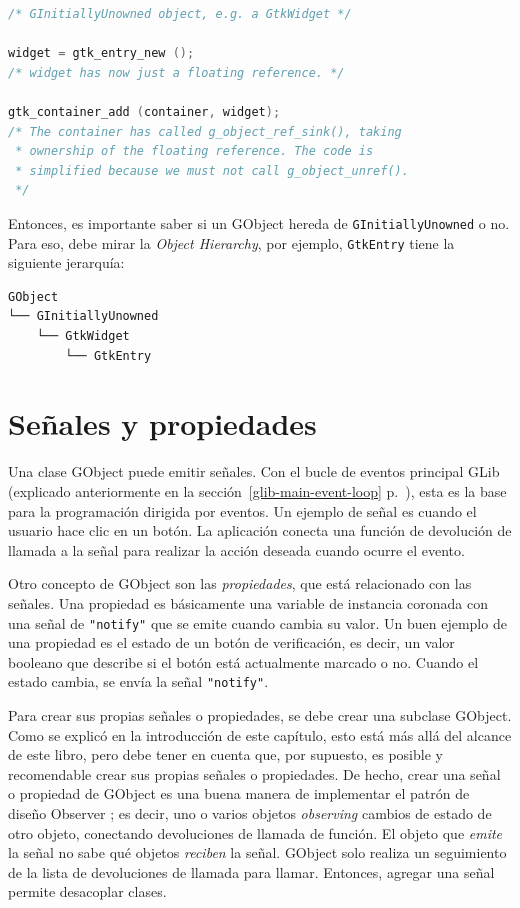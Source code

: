 \begin{lstlisting}[language=C, caption={Gestión de memoria de GObjects derivados de \lstinline{GInitiallyUnowned}.}, label=oop-gobject-mem-management-floating]
/* GInitiallyUnowned object, e.g. a GtkWidget */

widget = gtk_entry_new ();
/* widget has now just a floating reference. */

gtk_container_add (container, widget);
/* The container has called g_object_ref_sink(), taking
 * ownership of the floating reference. The code is
 * simplified because we must not call g_object_unref().
 */
\end{lstlisting}

Entonces, es importante saber si un GObject hereda de \lstinline{GInitiallyUnowned} o no. Para eso, debe mirar la \emph{Object Hierarchy}, por ejemplo, \lstinline{GtkEntry} tiene la siguiente jerarquía:

\begin{verbatim}
GObject
└── GInitiallyUnowned
    └── GtkWidget
        └── GtkEntry
\end{verbatim}

\section{Señales y propiedades}
\label{oop-gobject-signals-and-properties}

Una clase GObject puede emitir señales. Con el bucle de eventos principal GLib (explicado anteriormente en la sección~\ref{glib-main-event-loop} p.~\pageref{glib-main-event-loop}), esta es la base para la programación dirigida por eventos. Un ejemplo de señal es cuando el usuario hace clic en un botón. La aplicación conecta una función de devolución de llamada a la señal para realizar la acción deseada cuando ocurre el evento.

Otro concepto de GObject son las \emph{propiedades}, que está relacionado con las señales. Una propiedad es básicamente una variable de instancia coronada con una señal de \lstinline{"notify"} que se emite cuando cambia su valor. Un buen ejemplo de una propiedad es el estado de un botón de verificación, es decir, un valor booleano que describe si el botón está actualmente marcado o no. Cuando el estado cambia, se envía la señal \lstinline{"notify"}.

Para crear sus propias señales o propiedades, se debe crear una subclase GObject. Como se explicó en la introducción de este capítulo, esto está más allá del alcance de este libro, pero debe tener en cuenta que, por supuesto, es posible y recomendable crear sus propias señales o propiedades. De hecho, crear una señal o propiedad de GObject es una buena manera de implementar el patrón de diseño Observer \cite{design-patterns-book}; es decir, uno o varios objetos \emph{observing} cambios de estado de otro objeto, conectando devoluciones de llamada de función. El objeto que \emph{emite} la señal no sabe qué objetos \emph{reciben} la señal. GObject solo realiza un seguimiento de la lista de devoluciones de llamada para llamar. Entonces, agregar una señal permite desacoplar clases.

